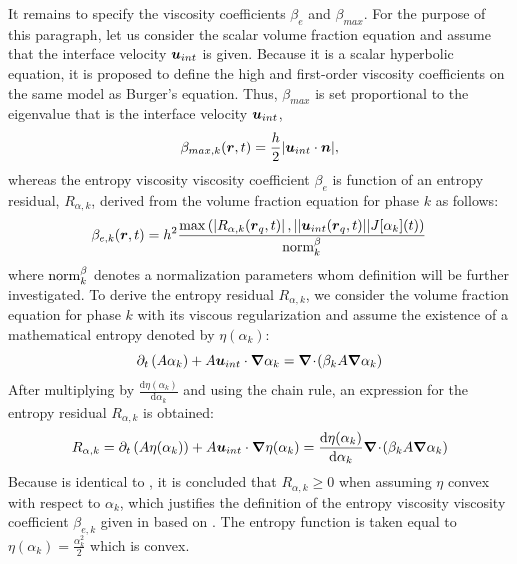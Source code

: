 It remains to specify the viscosity coefficients $\beta_e$ and $\beta_{max}$. For the purpose of this paragraph, let us consider the scalar volume fraction equation and assume that the interface velocity $\boldsymbol u_{int}$ is given. Because it is a scalar hyperbolic equation, it is proposed to define the high and first-order viscosity coefficients on the same model as Burger's equation. Thus, $\beta_{max}$ is set proportional to the eigenvalue that is the interface velocity $\boldsymbol u_{int}$,
%
\begin{equation}\label{eq:def-beta-max-sen-sect4}
\beta_{max,k}( \boldsymbol r, t) = \frac{h}{2} | \boldsymbol u_{int} \cdot \boldsymbol n |,
\end{equation}
%
whereas the entropy viscosity viscosity coefficient $\beta_e$ is function of an entropy residual, $R_{\alpha,k}$, derived from the volume fraction equation for phase $k$ as follows:
%
\begin{align}\label{eq:def-beta-sen-sect4}
\beta_{e,k}( \boldsymbol r, t) = h^2 \frac{\max\left( | R_{\alpha,k}(\boldsymbol r_q,t) |\,, || \boldsymbol u_{int}(\boldsymbol r_q,t) || J[\alpha_k](t) \right)}{\textrm{norm}_{k}^\beta} \,
\end{align}
%
where $\textrm{norm}_{k}^\beta$ denotes a normalization parameters whom definition will be further investigated. To derive the entropy residual $R_{\alpha,k}$, we consider the volume fraction equation for phase $k$ with its viscous regularization and assume the existence of a mathematical entropy denoted by $\eta(\alpha_k)$:
%
\begin{equation}\label{eq:vf-sem-sct4}
\partial_t \left(A \alpha_k \right) + A \boldsymbol u_{int} \cdot \boldsymbol{\nabla} \alpha_k = \boldsymbol{\nabla}\! \cdot \! \left( \beta_k A \boldsymbol{\nabla} \alpha_k \right)
\end{equation}
% 
After multiplying by $\frac{\text{d} \eta (\alpha_k)}{\text{d} \alpha_k}$ and using the chain rule, an expression for the entropy residual $R_{\alpha,k}$ is obtained:
%
\begin{equation}\label{eq:vf-sem2-sct4}
R_{\alpha,k} = \partial_t \left(A \eta(\alpha_k) \right) + A \boldsymbol u_{int} \cdot \boldsymbol{\nabla} \eta(\alpha_k) = \frac{\text{d} \eta (\alpha_k)}{\text{d} \alpha_k} \boldsymbol{\nabla}\! \cdot \! \left( \beta_k A \boldsymbol{\nabla} \alpha_k \right)
\end{equation}
% 
Because  is identical to , it is concluded that $R_{\alpha,k} \geq 0$ when assuming $\eta$ convex with respect to $\alpha_k$, which justifies the definition of the entropy viscosity viscosity coefficient $\beta_{e,k}$ given in  based on . The entropy function is taken equal to $\eta(\alpha_k) = \frac{\alpha_k^2}{2}$ which is convex.
